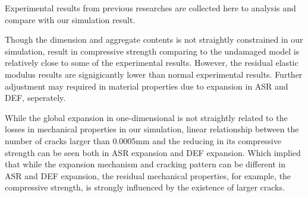 Experimental results from previous researches are collected here to analysis and compare with our simulation result.

Though the dimension and aggregate contents is not straightly constrained in our simulation, result in compressive strength comparing to the undamaged model is relatively close to some of the experimental results. However, the residual elastic modulus results are signigicantly lower than normal experimental results. Further adjustment may required in material properties due to expansion in ASR and DEF, seperately.

While the global expansion in one-dimensional is not straightly related to the losses in mechanical properties in our simulation, linear relationship between the number of cracks larger than 0.0005mm and the reducing in its compressive strength can be seen both in ASR expansion and DEF expansion. Which implied that while the expansion mechanism and cracking pattern can be different in ASR and DEF expansion, the residual mechanical properties, for example, the compressive strength, is strongly influenced by the existence of larger cracks. 

%
